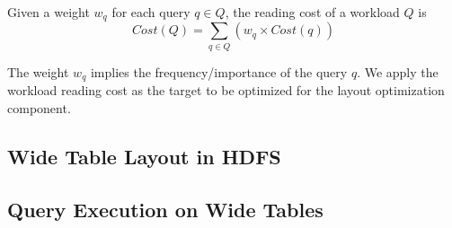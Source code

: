 \begin{Definition}\label{equ:wcost}
	Given a weight $w_q$ for each query $q\in Q$, the reading cost of a workload $Q$ is
	\begin{equation}
	Cost(Q) = \sum_{q\in Q}(w_q\times Cost(q))
	\label{equ:workloadcost}
	\end{equation}
\end{Definition}
The weight $w_q$ implies the frequency/importance of the query $q$. We apply the workload reading cost as the target to be optimized for the layout optimization component.

\subsection{Wide Table Layout in HDFS}


\subsection{Query Execution on Wide Tables}


